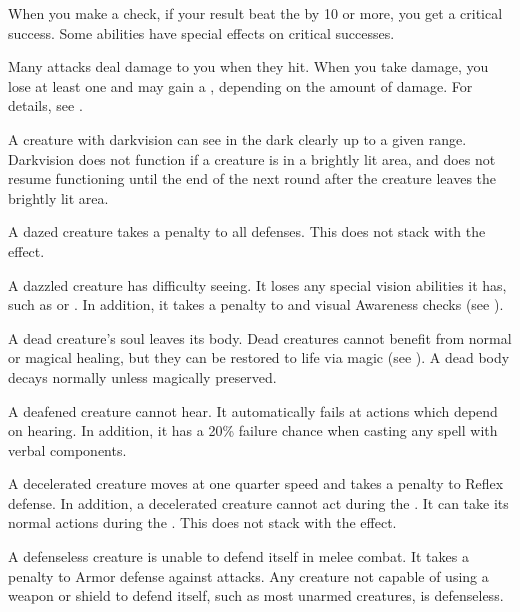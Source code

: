 When you make a check, if your result beat the  by 10 or more, you get a critical success.
Some abilities have special effects on critical successes.

 Many attacks deal damage to you when they hit.
When you take damage, you lose at least one  and may gain a , depending on the amount of damage.
For details, see .

 A creature with darkvision can see in the dark clearly up to a given range.
Darkvision does not function if a creature is in a brightly lit area, and does not resume functioning until the end of the next round after the creature leaves the brightly lit area.

 A dazed creature takes a  penalty to all defenses.
This does not stack with the  effect.

 A dazzled creature has difficulty seeing.
It loses any special vision abilities it has, such as  or .
In addition, it takes a  penalty to  and visual Awareness checks (see ).

 A dead creature's soul leaves its body. Dead creatures cannot benefit from normal or magical healing, but they can be restored to life via magic (see ). A dead body decays normally unless magically preserved.

 A deafened creature cannot hear. It automatically fails at actions which depend on hearing. In addition, it has a 20\% failure chance when casting any spell with verbal components.

 A decelerated creature moves at one quarter speed and takes a  penalty to Reflex defense.
In addition, a decelerated creature cannot act during the .
It can take its normal actions during the .
This does not stack with the  effect.

 A defenseless creature is unable to defend itself in melee combat.
It takes a  penalty to Armor defense against  attacks.
Any creature not capable of using a weapon or shield to defend itself, such as most unarmed creatures, is defenseless.

